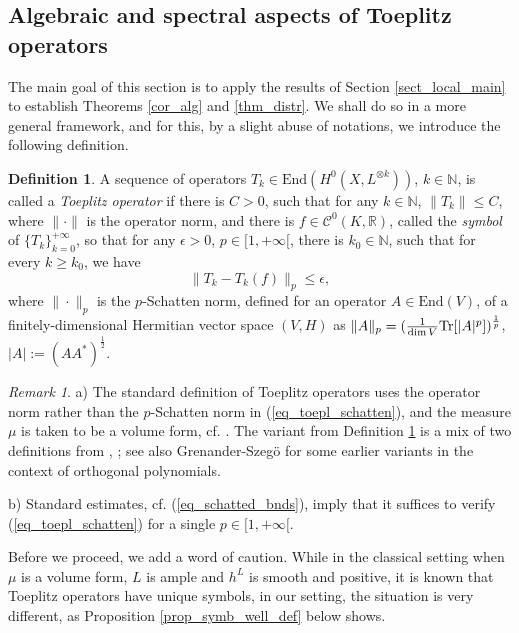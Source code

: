 \documentclass[12pt]{article}
\numberwithin{equation}{section}
\theoremstyle{theorem}
\theoremstyle{definition}
\newtheorem{defn}[thm]{Definition}
\theoremstyle{remark}
\newtheorem{rem}[thm]{Remark}
\newcommand{\real}{\mathbb{R}}
\newcommand{\nat}{\mathbb{N}}
\newcommand{\enmr}[1]{\text{End}{(#1)}}
\newcommand{\ccal}{\mathscr{C}}
\begin{document}
	\subsection{Algebraic and spectral aspects of Toeplitz operators}\label{sect_toepl}
	The main goal of this section is to apply the results of Section \ref{sect_local_main} to establish Theorems \ref{cor_alg} and \ref{thm_distr}.
	We shall do so in a more general framework, and for this, by a slight abuse of notations, we introduce the following definition.
	\begin{defn}\label{defn_toepl_sch}
		A sequence of operators $T_k \in {\enmr{H^0(X, L^{\otimes k})}}$, $k \in \nat$, is called a \textit{Toeplitz operator} if there is $C > 0$, such that for any $k \in \nat$, $\| T_k \| \leq C$, where $\| \cdot \|$ is the operator norm, and there is $f \in \ccal^0(K, \real)$, called the \textit{symbol} of $\{T_k\}_{k = 0}^{+ \infty}$, so that for any $\epsilon > 0$, $p \in [1, +\infty[$, there is $k_0 \in \nat$, such that for every $k \geq k_0$, we have
		\begin{equation}\label{eq_toepl_schatten}
			\big \| T_k -  T_k(f) \big \|_p \leq \epsilon,
		\end{equation}
		where $\| \cdot \|_p$ is the $p$-Schatten norm, defined for an operator $A \in {\enmr{V}}$, of a finitely-dimensional Hermitian vector space $(V, H)$ as $\| A \|_p = (\frac{1}{\dim V} {\rm{Tr}}[|A|^p])^{\frac{1}{p}}$, $|A| := (A A^*)^{\frac{1}{2}}$.
	\end{defn}
	\begin{rem}
		a) The standard definition of Toeplitz operators uses the operator norm rather than the $p$-Schatten norm in (\ref{eq_toepl_schatten}), and the measure $\mu$ is taken to be a volume form, cf. \cite{MaHol}. 
		The variant from Definition \ref{defn_toepl_sch} is a mix of two definitions from \cite{FinSubmToepl}, \cite{FinEigToepl}; see also Grenander-Szeg{\"o} \cite[\S 7.4]{GrenanSzego} for some earlier variants in the context of orthogonal polynomials.
		\par 
		b) 
		Standard estimates, cf. (\ref{eq_schatted_bnds}), imply that it suffices to verify (\ref{eq_toepl_schatten}) for a single $p \in [1, +\infty[$.
	\end{rem}
	Before we proceed, we add a word of caution.
	While in the classical setting when $\mu$ is a volume form, $L$ is ample and $h^L$ is smooth and positive, it is known that Toeplitz operators have unique symbols, in our setting, the situation is very different, as Proposition \ref{prop_symb_well_def} below shows.
\end{document}
